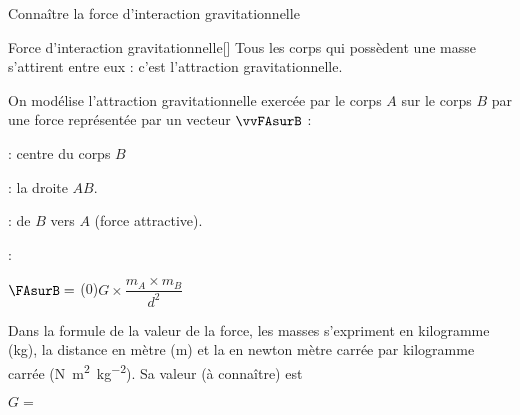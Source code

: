 \teteSndMouv

\nomPrenomClasse
{}

\begin{objectifs}
  \item Connaître la force d'interaction gravitationnelle
\end{objectifs}



\begin{doc}{Force d'interaction gravitationnelle}[\label{doc:interaction_gravitationnelle}]
  \chevron Tous les corps qui possèdent une masse s’attirent entre eux : c’est l’attraction gravitationnelle.
  \begin{importants}
    On modélise l'attraction gravitationnelle exercée par le corps $A$ sur le corps $B$ par une force représentée par un vecteur $\vvFAsurB$ :
    
    \vspace*{-12pt}
    \begin{wrapfigure}[6]{r}{0.4\linewidth}
      \vspace*{-10pt}
      
    \end{wrapfigure}
    \phantom{b}
    
    \begin{listePoints}
      \item {} : centre du corps $B$
      \item {} : la droite $AB$.
      \item {} : de $B$ vers $A$ (force attractive).
      \item {} : 
    \end{listePoints}
    \begin{center}
      $\FAsurB =$ \texteTrou(0){$G\times \dfrac{m_A \times m_B}{d^2}$}
    \end{center}
      
    Dans la formule de la valeur de la force, les masses s'expriment en kilogramme (\unit{\kg}),
    la distance en mètre (\unit{\m}) et
    la  en newton mètre carrée par kilogramme carrée (\unit{\newton \m\squared \per\kg\squared}).
    Sa valeur (à connaître) est 
    \begin{center}
      $G =$ 
    \end{center}
  \end{importants}
\end{doc}

